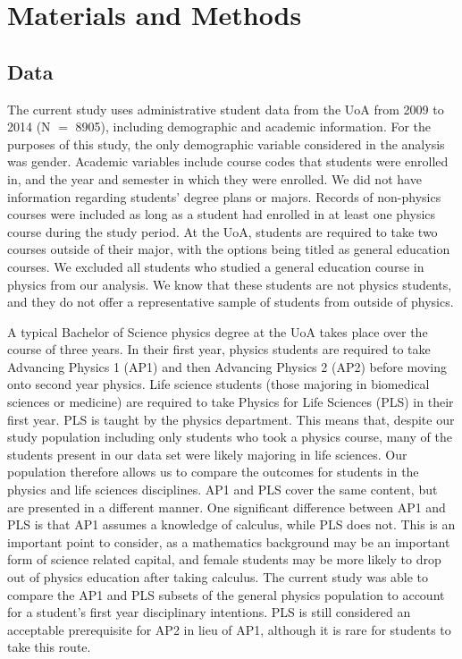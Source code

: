 \section*{Materials and Methods}

\subsection*{Data}
The current study uses administrative student data from the UoA from 2009 to 2014 (N $=$ 8905), including demographic and academic information. For the purposes of this study, the only demographic variable considered in the analysis was gender. Academic variables include course codes that students were enrolled in, and the year and semester in which they were enrolled. We did not have information regarding students' degree plans or majors. Records of non-physics courses were included as long as a student had enrolled in at least one physics course during the study period. At the UoA, students are required to take two courses outside of their major, with the options being titled as general education courses. We excluded all students who studied a general education course in physics from our analysis. We know that these students are not physics students, and they do not offer a representative sample of students from outside of physics.

A typical Bachelor of Science physics degree at the UoA takes place over the course of three years. In their first year, physics students are required to take Advancing Physics 1 (AP1) and then Advancing Physics 2 (AP2) before moving onto second year physics. Life science students (those majoring in biomedical sciences or medicine) are required to take Physics for Life Sciences (PLS) in their first year. PLS is taught by the physics department. This means that, despite our study population including only students who took a physics course, many of the students present in our data set were likely majoring in life sciences. Our population therefore allows us to compare the outcomes for students in the physics and life sciences disciplines. AP1 and PLS cover the same content, but are presented in a different manner. One significant difference between AP1 and PLS is that AP1 assumes a knowledge of calculus, while PLS does not. This is an important point to consider, as a mathematics background may be an important form of science related capital\cite{Black2016}, and female students may be more likely to drop out of physics education after taking calculus.\cite{Ellis_2016} The current study was able to compare the AP1 and PLS subsets of the general physics population to account for a student's first year disciplinary intentions. PLS is still considered an acceptable prerequisite for AP2 in lieu of AP1, although it is rare for students to take this route. 


